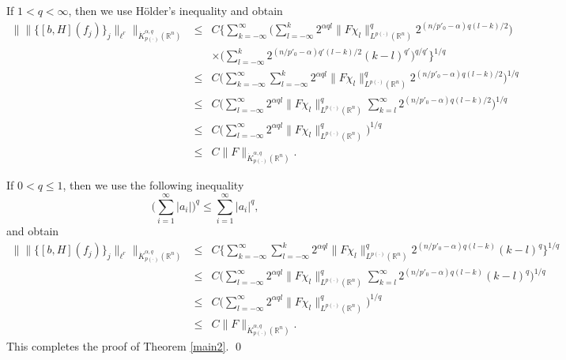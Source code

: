 \documentclass{amse-new}
\numberwithin{equation}{section} %
\begin{document}
If $1<q<\infty$, then we use H\"{o}lder's inequality and obtain
\begin{eqnarray*}
\|\|\{[b,H](f_{j})\}_{j}\|_{\ell^{r}}\|_{\dot{K}^{\alpha,q}_{p(\cdot)}(\mathbb{R}^n)}
&\leq& C\bigg\{\sum_{k=-\infty}^{\infty}\bigg(\sum^{k}_{l=-\infty}2^{\alpha ql}\|F\chi_{l}\|_{L^{p(\cdot)}(\mathbb{R}^n)}^{q}2^{(n/p'_{0}-\alpha)q(l-k)/2}\bigg)\\
&&\times\bigg(\sum_{l=-\infty}^{k}2^{(n/p'_{0}-\alpha)q'(l-k)/2}(k-l)^{q'}\bigg)^{q/q'}\bigg\}^{1/q}\\
&\leq& C\bigg(\sum_{k=-\infty}^{\infty}\sum_{l=-\infty}^{k}2^{\alpha ql}\|F\chi_{l}\|_{L^{p(\cdot)}(\mathbb{R}^n)}^{q}2^{(n/p'_{0}-\alpha)q(l-k)/2}\bigg)^{1/q}\\
&\leq& C\bigg(\sum_{l=-\infty}^{\infty}2^{\alpha ql}\|F\chi_{l}\|_{L^{p(\cdot)}(\mathbb{R}^n)}^{q}\sum_{k=l}^{\infty}2^{(n/p'_{0}-\alpha)q(l-k)/2}\bigg)^{1/q}\\
&\leq& C\bigg(\sum_{l=-\infty}^{\infty}2^{\alpha ql}\|F\chi_{l}\|_{L^{p(\cdot)}(\mathbb{R}^n)}^{q}\bigg)^{1/q}\\
&\leq& C\|F\|_{\dot{K}^{\alpha,q}_{p(\cdot)}(\mathbb{R}^n)}.
\end{eqnarray*}

If $0<q\leq 1$, then we use the following inequality
$$\Big(\sum_{i=1}^{\infty}|a_{i}|\Big)^{q}\leq \sum_{i=1}^{\infty}|a_{i}|^{q},$$
and obtain
\begin{eqnarray*}
\|\|\{[b,H](f_{j})\}_{j}\|_{\ell^{r}}\|_{\dot{K}^{\alpha,q}_{p(\cdot)}(\mathbb{R}^n)}
&\leq& C\bigg\{\sum_{k=-\infty}^{\infty}\sum^{k}_{l=-\infty}2^{\alpha ql}\|F\chi_{l}\|_{L^{p(\cdot)}(\mathbb{R}^n)}^{q}2^{(n/p'_{0}-\alpha)q(l-k)}(k-l)^{q}\bigg\}^{1/q}\\
&\leq& C\bigg(\sum_{l=-\infty}^{\infty}2^{\alpha ql}\|F\chi_{l}\|_{L^{p(\cdot)}(\mathbb{R}^n)}^{q}\sum_{k=l}^{\infty}2^{(n/p'_{0}-\alpha)q(l-k)}(k-l)^{q}\bigg)^{1/q}\\
&\leq& C\bigg(\sum_{l=-\infty}^{\infty}2^{\alpha ql}\|F\chi_{l}\|_{L^{p(\cdot)}(\mathbb{R}^n)}^{q}\bigg)^{1/q}\\
&\leq& C\|F\|_{\dot{K}^{\alpha,q}_{p(\cdot)}(\mathbb{R}^n)}.
\end{eqnarray*}
This completes the proof of Theorem \ref{main2}. \qed

\vspace{0.3cm}

\end{document}
